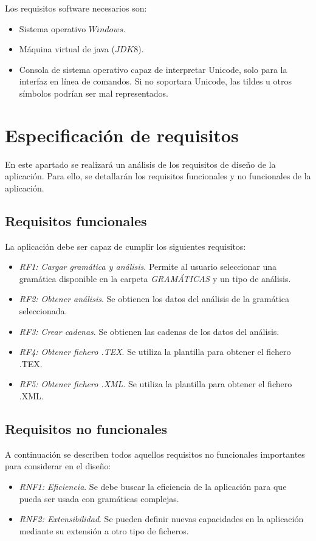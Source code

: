 Los requisitos software necesarios son:
\begin{itemize}
\item Sistema operativo $Windows$.
\item Máquina virtual de java ($JDK 8$).
\item Consola de sistema operativo capaz de interpretar Unicode, solo para la interfaz en línea de comandos. Si no soportara Unicode, las tildes u otros símbolos podrían ser mal representados.
\end{itemize}

\section{Especificación de requisitos}
En este apartado se realizará un análisis de los requisitos de diseño de la aplicación. Para ello, se detallarán los requisitos funcionales y no funcionales de la aplicación.

\subsection{Requisitos funcionales}
La aplicación debe ser capaz de cumplir los siguientes requisitos:

\begin{itemize}
\item \textit{RF1: Cargar gramática y análisis}. Permite al usuario seleccionar una gramática disponible en la carpeta \textit{GRAMÁTICAS} y un tipo de análisis.
\item \textit{RF2: Obtener análisis}. Se obtienen los datos del análisis de la gramática seleccionada.
\item \textit{RF3: Crear cadenas}. Se obtienen las cadenas de los datos del análisis.
\item \textit{RF4: Obtener fichero .TEX}. Se utiliza la plantilla para obtener el fichero .TEX.
\item \textit{RF5: Obtener fichero .XML}. Se utiliza la plantilla para obtener el fichero .XML.
\end{itemize}



\subsection{Requisitos no funcionales}
A continuación se describen todos aquellos requisitos no funcionales importantes para considerar en el diseño:


\begin{itemize}
\item \textit{RNF1: Eficiencia}. Se debe buscar la eficiencia de la aplicación para que pueda ser usada con gramáticas complejas.
\item \textit{RNF2: Extensibilidad}. Se pueden definir nuevas capacidades en la aplicación mediante su extensión a otro tipo de ficheros.
\end{itemize}